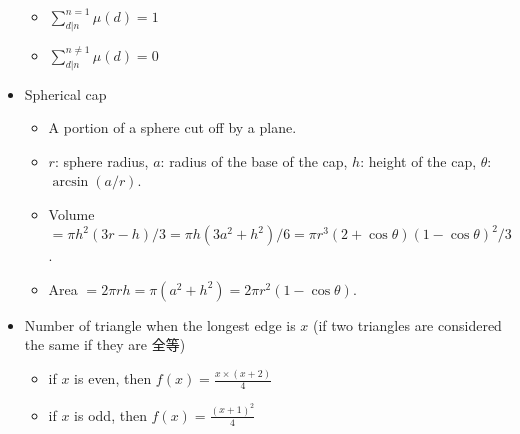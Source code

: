 \documentclass[10pt, a4paper, twocolumn, oneside]{article}
\begin{document}
\begin{itemize}
\begin{itemize}
  \item $\sum_{d \vert n}^{n=1} \mu (d)  = 1$
  \item $\sum_{d \vert n}^{n \neq 1} \mu (d)  = 0$
\end{itemize}
\item Spherical cap
\begin{itemize}
    \itemsep-0.5em
  \item A portion of a sphere cut off by a plane.
  \item $r$: sphere radius, $a$: radius of the base of the cap, $h$: height of the cap, $\theta$: $\arcsin(a/r)$.
  \item Volume $=\pi h^2(3r-h)/3=\pi h(3a^2+h^2)/6=\pi r^3(2+\cos\theta)(1-\cos\theta)^2/3$.
  \item Area $=2\pi rh=\pi(a^2+h^2)=2\pi r^2(1-\cos\theta)$.
\end{itemize}
\item Number of triangle when the longest edge is $x$ (if two triangles are considered the same if they are 全等)
\begin{itemize}
    \itemsep-0.5em
  \item if $x$ is even, then $f(x) = \frac{x \times (x + 2)}{4}$
  \item if $x$ is odd, then $f(x) = \frac{(x + 1)^2}{4}$
\end{itemize}
\end{itemize}
\end{document}
